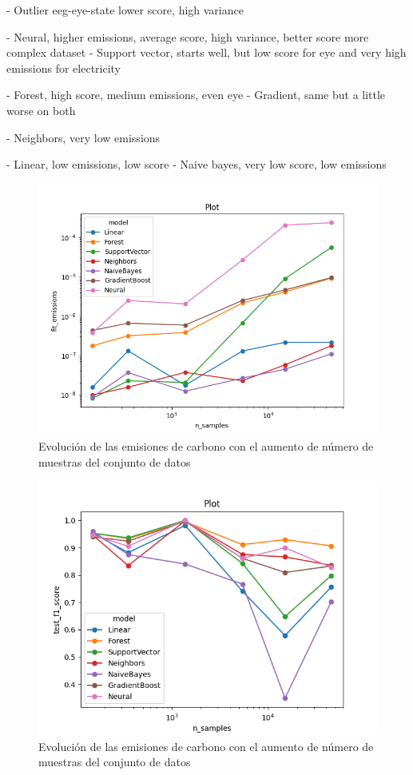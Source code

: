 - Outlier eeg-eye-state lower score, high variance

- Neural, higher emissions, average score, high variance, better score more complex dataset
- Support vector, starts well, but low score for eye and very high emissions for electricity

- Forest, high score, medium emissions, even eye
- Gradient, same but a little worse on both

- Neighbors, very low emissions

- Linear, low emissions, low score
- Naive bayes, very low score, low emissions



\begin{figure}[H]
  \centerline{
     \includegraphics[width=1\textwidth, keepaspectratio]{img/graph/line-nsamples-emission-log.png}
  }
  \caption{Evolución de las emisiones de carbono con el aumento de número de muestras del conjunto de datos}
  \label{fig:line-emissions-samples}
\end{figure}
\begin{figure}[H]
  \centerline{
     \includegraphics[width=1\textwidth, keepaspectratio]{img/graph/line-nsamples-fscore-loglin.png}
  }
  \caption{Evolución de las emisiones de carbono con el aumento de número de muestras del conjunto de datos}
  \label{fig:line-fscore-samples}
\end{figure}

